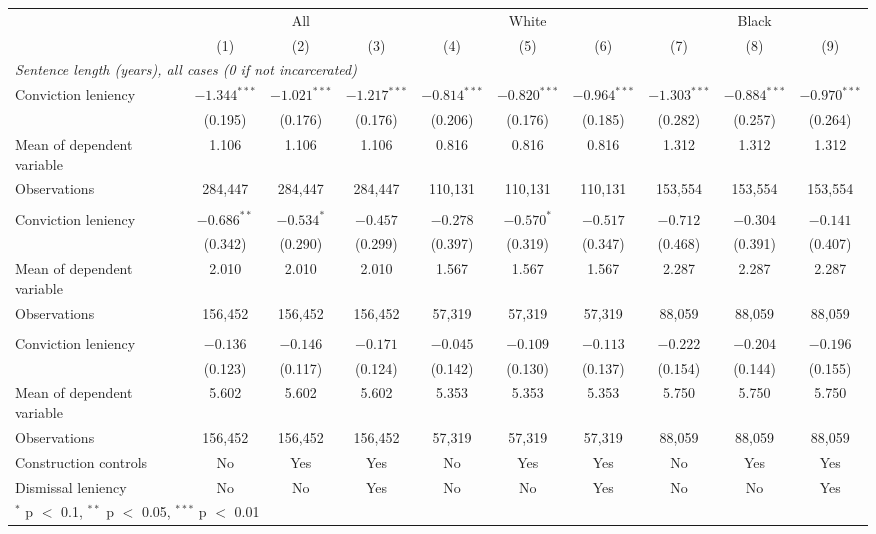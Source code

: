 \begin{tabular}{lccccccccc}
\toprule
 & \multicolumn{3}{c}{All} & \multicolumn{3}{c}{White} & \multicolumn{3}{c}{Black} \\
\cmidrule(lr){2-4}\cmidrule(lr){5-7}\cmidrule(lr){8-10}
 & (1) & (2) & (3) & (4) & (5) & (6) & (7) & (8) & (9) \\
\midrule
\multicolumn{10}{l}{\textit{Sentence length (years), all cases (0 if not incarcerated)}} \\
\quad Conviction leniency & $-1.344^{***}$ & $-1.021^{***}$ & $-1.217^{***}$ & $-0.814^{***}$ & $-0.820^{***}$ & $-0.964^{***}$ & $-1.303^{***}$ & $-0.884^{***}$ & $-0.970^{***}$ \\
 & (0.195) & (0.176) & (0.176) & (0.206) & (0.176) & (0.185) & (0.282) & (0.257) & (0.264) \\
\quad Mean of dependent variable & 1.106 & 1.106 & 1.106 & 0.816 & 0.816 & 0.816 & 1.312 & 1.312 & 1.312 \\
\quad Observations & 284,447 & 284,447 & 284,447 & 110,131 & 110,131 & 110,131 & 153,554 & 153,554 & 153,554 \\
\addlinespace
\multicolumn{10}{l}{\textit{Sentence length (years), incarcerated}} \\
\quad Conviction leniency & $-0.686^{**}$ & $-0.534^{*}$ & $-0.457$ & $-0.278$ & $-0.570^{*}$ & $-0.517$ & $-0.712$ & $-0.304$ & $-0.141$ \\
 & (0.342) & (0.290) & (0.299) & (0.397) & (0.319) & (0.347) & (0.468) & (0.391) & (0.407) \\
\quad Mean of dependent variable & 2.010 & 2.010 & 2.010 & 1.567 & 1.567 & 1.567 & 2.287 & 2.287 & 2.287 \\
\quad Observations & 156,452 & 156,452 & 156,452 & 57,319 & 57,319 & 57,319 & 88,059 & 88,059 & 88,059 \\
\addlinespace
\multicolumn{10}{l}{\textit{Log sentence length (days), incarcerated}} \\
\quad Conviction leniency & $-0.136$ & $-0.146$ & $-0.171$ & $-0.045$ & $-0.109$ & $-0.113$ & $-0.222$ & $-0.204$ & $-0.196$ \\
 & (0.123) & (0.117) & (0.124) & (0.142) & (0.130) & (0.137) & (0.154) & (0.144) & (0.155) \\
\quad Mean of dependent variable & 5.602 & 5.602 & 5.602 & 5.353 & 5.353 & 5.353 & 5.750 & 5.750 & 5.750 \\
\quad Observations & 156,452 & 156,452 & 156,452 & 57,319 & 57,319 & 57,319 & 88,059 & 88,059 & 88,059 \\
\midrule
Construction controls & No & Yes & Yes & No & Yes & Yes & No & Yes & Yes \\
Dismissal leniency & No & No & Yes & No & No & Yes & No & No & Yes \\
\bottomrule
\multicolumn{10}{l}{\footnotesize $^{*}$ p $<$ 0.1, $^{**}$ p $<$ 0.05, $^{***}$ p $<$ 0.01} \\
\end{tabular}
